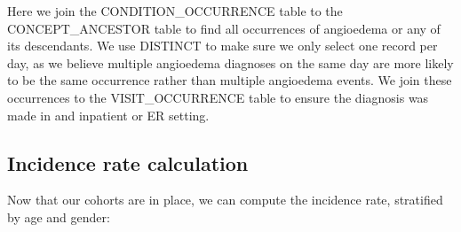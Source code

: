 \documentclass[11pt]{book}
\theoremstyle{definition}
\theoremstyle{definition}
\theoremstyle{definition}
\theoremstyle{remark}
\begin{document}
Here we join the CONDITION\_OCCURRENCE table to the CONCEPT\_ANCESTOR table to find all occurrences of angioedema or any of its descendants. We use DISTINCT to make sure we only select one record per day, as we believe multiple angioedema diagnoses on the same day are more likely to be the same occurrence rather than multiple angioedema events. We join these occurrences to the VISIT\_OCCURRENCE table to ensure the diagnosis was made in and inpatient or ER setting.

\hypertarget{incidence-rate-calculation}{%
\subsection{Incidence rate calculation}\label{incidence-rate-calculation}}

Now that our cohorts are in place, we can compute the incidence rate, stratified by age and gender:
\end{document}
